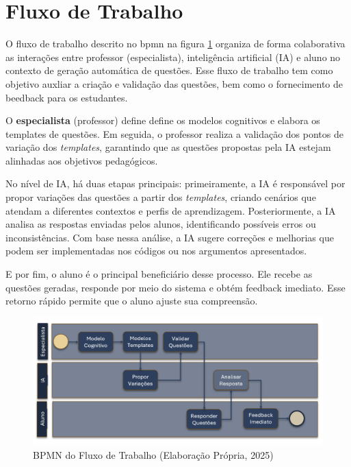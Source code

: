     
\section{Fluxo de Trabalho}

O fluxo de trabalho descrito no \gls{bpmn} na figura \ref{fig:bpmn-fluxo} organiza de forma colaborativa as interações entre professor (especialista), inteligência artificial (IA) e aluno no contexto de geração automática de questões. Esse fluxo de trabalho tem como objetivo auxliar a criação e validação das questões, bem como o fornecimento de beedback para os estudantes. 

O \textbf{especialista} (professor) define define os modelos cognitivos  e elabora os templates de questões. Em seguida, o professor realiza a validação dos pontos de variação dos \textit{templates}, garantindo que as questões propostas pela IA estejam alinhadas aos objetivos pedagógicos.

No nível de IA, há duas etapas principais: primeiramente, a IA é responsável por propor variações das questões a partir dos \textit{templates}, criando cenários  que atendam a diferentes contextos e perfis de aprendizagem. Posteriormente, a IA analisa as respostas enviadas pelos alunos, identificando possíveis erros ou inconsistências. Com base nessa análise, a IA sugere correções e melhorias que podem ser implementadas nos códigos ou nos argumentos apresentados.

E por fim, o aluno é o principal beneficiário desse processo. Ele recebe as questões geradas, responde por meio do sistema e obtém feedback imediato. Esse retorno rápido permite que o aluno ajuste sua compreensão. 

\begin{figure}[ht]
	\centering
	\includegraphics[width=16cm]{./imagens/capitulo6/bpmn-fluxo}
	\caption{BPMN do Fluxo de Trabalho (Elaboração Própria, 2025) }
	\label{fig:bpmn-fluxo}
\end{figure}